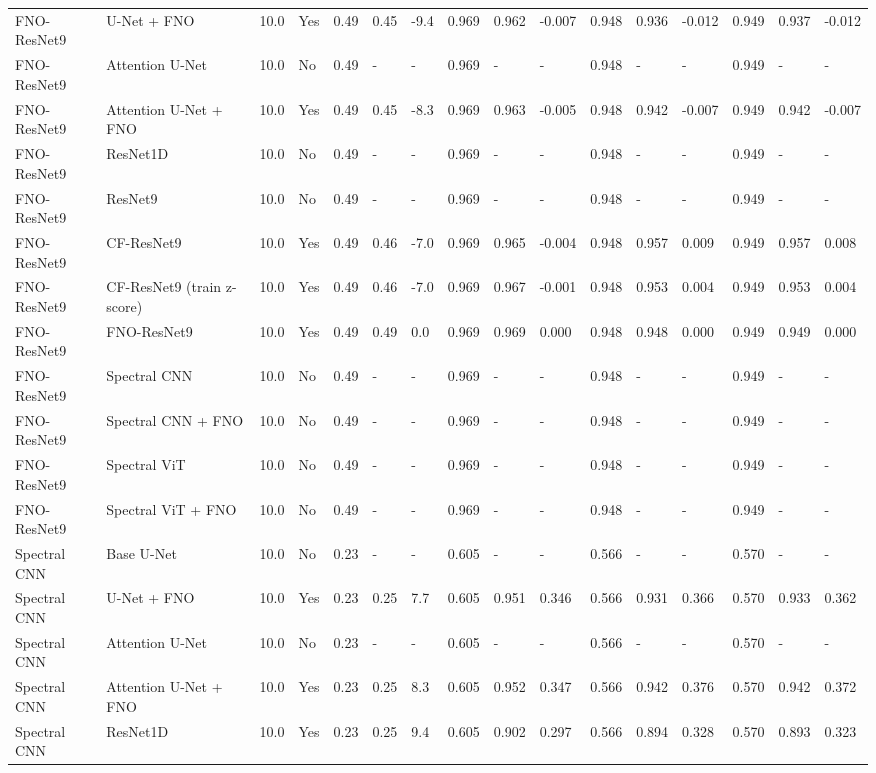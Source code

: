 \begin{longtable}{llllllllllllllll}
FNO-ResNet9 & U-Net + FNO & 10.0 & Yes & 0.49 & 0.45 & -9.4 & 0.969 & 0.962 & -0.007 & 0.948 & 0.936 & -0.012 & 0.949 & 0.937 & -0.012 \\
FNO-ResNet9 & Attention U-Net & 10.0 & No & 0.49 & - & - & 0.969 & - & - & 0.948 & - & - & 0.949 & - & - \\
FNO-ResNet9 & Attention U-Net + FNO & 10.0 & Yes & 0.49 & 0.45 & -8.3 & 0.969 & 0.963 & -0.005 & 0.948 & 0.942 & -0.007 & 0.949 & 0.942 & -0.007 \\
FNO-ResNet9 & ResNet1D & 10.0 & No & 0.49 & - & - & 0.969 & - & - & 0.948 & - & - & 0.949 & - & - \\
FNO-ResNet9 & ResNet9 & 10.0 & No & 0.49 & - & - & 0.969 & - & - & 0.948 & - & - & 0.949 & - & - \\
FNO-ResNet9 & CF-ResNet9 & 10.0 & Yes & 0.49 & 0.46 & -7.0 & 0.969 & 0.965 & -0.004 & 0.948 & 0.957 & 0.009 & 0.949 & 0.957 & 0.008 \\
FNO-ResNet9 & CF-ResNet9 (train z-score) & 10.0 & Yes & 0.49 & 0.46 & -7.0 & 0.969 & 0.967 & -0.001 & 0.948 & 0.953 & 0.004 & 0.949 & 0.953 & 0.004 \\
FNO-ResNet9 & FNO-ResNet9 & 10.0 & Yes & 0.49 & 0.49 & 0.0 & 0.969 & 0.969 & 0.000 & 0.948 & 0.948 & 0.000 & 0.949 & 0.949 & 0.000 \\
FNO-ResNet9 & Spectral CNN & 10.0 & No & 0.49 & - & - & 0.969 & - & - & 0.948 & - & - & 0.949 & - & - \\
FNO-ResNet9 & Spectral CNN + FNO & 10.0 & No & 0.49 & - & - & 0.969 & - & - & 0.948 & - & - & 0.949 & - & - \\
FNO-ResNet9 & Spectral ViT & 10.0 & No & 0.49 & - & - & 0.969 & - & - & 0.948 & - & - & 0.949 & - & - \\
FNO-ResNet9 & Spectral ViT + FNO & 10.0 & No & 0.49 & - & - & 0.969 & - & - & 0.948 & - & - & 0.949 & - & - \\
Spectral CNN & Base U-Net & 10.0 & No & 0.23 & - & - & 0.605 & - & - & 0.566 & - & - & 0.570 & - & - \\
Spectral CNN & U-Net + FNO & 10.0 & Yes & 0.23 & 0.25 & 7.7 & 0.605 & 0.951 & 0.346 & 0.566 & 0.931 & 0.366 & 0.570 & 0.933 & 0.362 \\
Spectral CNN & Attention U-Net & 10.0 & No & 0.23 & - & - & 0.605 & - & - & 0.566 & - & - & 0.570 & - & - \\
Spectral CNN & Attention U-Net + FNO & 10.0 & Yes & 0.23 & 0.25 & 8.3 & 0.605 & 0.952 & 0.347 & 0.566 & 0.942 & 0.376 & 0.570 & 0.942 & 0.372 \\
Spectral CNN & ResNet1D & 10.0 & Yes & 0.23 & 0.25 & 9.4 & 0.605 & 0.902 & 0.297 & 0.566 & 0.894 & 0.328 & 0.570 & 0.893 & 0.323 \\

\end{longtable}
